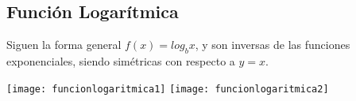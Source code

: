 \subsection{Función Logarítmica}
Siguen la forma general $f(x) = log_b{x}$, y son inversas de las funciones exponenciales, siendo simétricas con respecto a $y = x$.\\
\begin{minipage}[c]{\columnwidth}
    \texttt{[image: funcionlogaritmica1]}
    \texttt{[image: funcionlogaritmica2]}
\end{minipage}